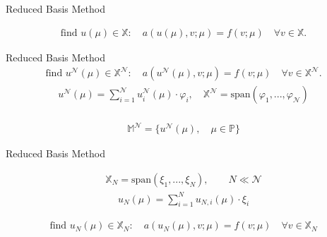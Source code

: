 \begin{frame}{Reduced Basis Method}
	\Large{}
	\normalsize
	\vspace{5mm}
	\begin{figure}
		 
	\end{figure}

	\begin{align*}
	\text{find }u(\mu) \in \mathbb{X} :\quad a(u(\mu),v;\mu) = f(v;\mu) \quad \forall v \in \mathbb{X}.
	\end{align*}
		
\end{frame}

\begin{frame}{Reduced Basis Method}
	\Large{}
	\normalsize
	\begin{align*}
	\text{find }u^\mathcal{ N }(\mu) \in \mathbb{X^\mathcal{ N }} :\quad a(u^\mathcal{ N }(\mu),v;\mu) = f(v;\mu) \quad \forall v \in \mathbb{X^\mathcal{ N }}.
	\end{align*}
	\Large{}
	\begin{align*}
	u^\mathcal{ N }(\mu) = \sum_{i=1}^{\mathcal{ N }} u_{i}^\mathcal{ N }(\mu) \cdot \varphi_i,  \quad   \mathbb{X^\mathcal{ N }} = \text{span}(\varphi_1, ...,  \varphi_\mathcal{ N })
	\end{align*}
	\Large{}\\
	\begin{align*}
	\mathbb{M^\mathcal{N}} = \{u^\mathcal{N}(\mu),\quad \mu \in \mathbb{P}\}
	\end{align*}
	
\end{frame}

\begin{frame}{Reduced Basis Method}
	\Large{}
	
	\begin{align*}
	\mathbb{X}_N = \text{span}(\xi_1, ..., \xi_N), \qquad N \ll \mathcal{ N } 
	\end{align*}
	\Large{}
	\begin{align*}
	u_N (\mu) = \sum_{i=1}^{ N } u_{N,i}(\mu) \cdot \xi_i
	\end{align*}
	
	\Large{}
	\normalsize
	\vspace{0.5cm}
	\begin{align*}
	\text{find }u_N(\mu) \in \mathbb{X}_N :\quad a(u_N(\mu),v;\mu) = f(v;\mu) \quad \forall v \in \mathbb{X}_N
	\end{align*}
	
	
\end{frame}

